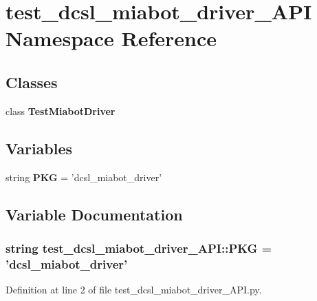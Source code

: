 \section{test\-\_\-dcsl\-\_\-miabot\-\_\-driver\-\_\-\-A\-P\-I \-Namespace \-Reference}
\label{namespacetest__dcsl__miabot__driver__API}
\subsection*{\-Classes}
\begin{DoxyCompactItemize}
\item 
class {\bf \-Test\-Miabot\-Driver}
\end{DoxyCompactItemize}
\subsection*{\-Variables}
\begin{DoxyCompactItemize}
\item 
string {\bf \-P\-K\-G} = 'dcsl\-\_\-miabot\-\_\-driver'
\end{DoxyCompactItemize}


\subsection{\-Variable \-Documentation}
\subsubsection[{\-P\-K\-G}]{\setlength{\rightskip}{0pt plus 5cm}string {\bf test\-\_\-dcsl\-\_\-miabot\-\_\-driver\-\_\-\-A\-P\-I\-::\-P\-K\-G} = 'dcsl\-\_\-miabot\-\_\-driver'}\label{namespacetest__dcsl__miabot__driver__API_a626fbff2cd988194a4d15b6d130a34d3}


\-Definition at line 2 of file test\-\_\-dcsl\-\_\-miabot\-\_\-driver\-\_\-\-A\-P\-I.\-py.

